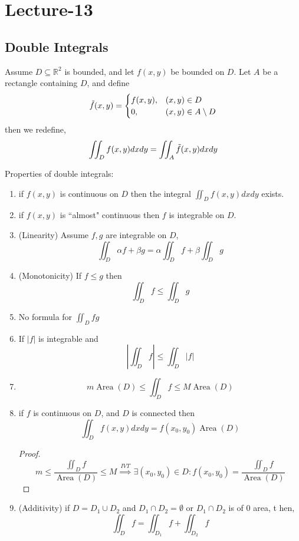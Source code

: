 \newpage
\section{Lecture-13}
\subsection{Double Integrals}
\begin{definition}
    Assume $D\subseteq\mathbb R^2$ is bounded, and let $f(x,y)$ be bounded on $D$. Let $A$ be a rectangle containing $D$, and define $$\Tilde{f}(x,y)=\begin{cases}
        f(x,y), & (x,y)\in D\\
        0, & (x,y)\in A\setminus D
    \end{cases}$$
    then we redefine, 
    $$
    \iint_D f(x,y)dxdy=\iint_A \Tilde{f}(x,y)dxdy 
    $$
\end{definition}
Properties of double integrals:
\begin{enumerate}
    \item if $f(x,y)$ is continuous on $D$ then the integral $\iint_D f(x,y)dxdy$ exists.
    \item if $f(x,y)$ is ``almost" continuous then $f$ is integrable on $D$.
    \item (Linearity) Assume $f,g$ are integrable on $D$, 
    $$\iint_{D}\alpha f+\beta g=\alpha\iint_{D}f+\beta \iint_{D}g$$
    \item (Monotonicity) If $f\leq g$ then
    $$\iint_{D} f\leq \iint_{D} g$$
    \item No formula for $\iint_{D} fg$
    \item If $|f|$ is integrable and $$\left|\iint_{D}f\right|\leq \iint_{D}|f|$$
    \item $$m\operatorname{Area}(D)\leq\iint_{D} f\leq M\operatorname{Area}(D)$$
    \item if $f$ is continuous on $D$, and $D$ is connected then $$\iint_{D} f(x,y)dxdy=f(x_0,y_0)\operatorname{Area}(D)$$ 
    \begin{proof}
    $$m\leq\frac{\iint_{D} f}{\operatorname{Area}(D)}\leq M\stackrel{IVT}{\implies} \exists (x_0,y_0)\in D:f(x_0,y_0)=\frac{\iint_{D} f}{\operatorname{Area}(D)}$$
    \end{proof}
    \item (Additivity) if $D=D_1\cup D_2$ and $D_1\cap D_2=\emptyset$ or $D_1\cap D_2$ is of $0$ area, t hen, 
    $$
    \iint_{D} f=\iint_{D_1} f+\iint_{D_2} f
    $$
\end{enumerate}
